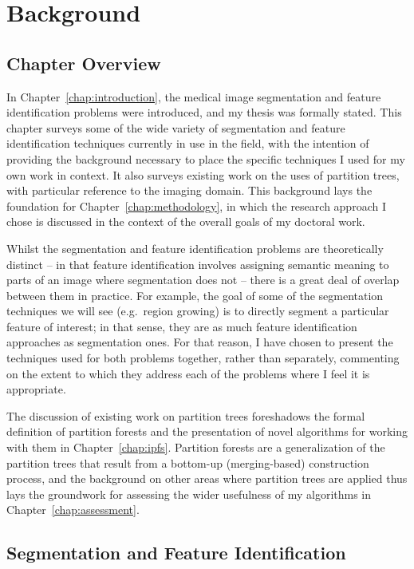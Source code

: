 \chapter{Background}
\label{chap:background}

\section{Chapter Overview}

In Chapter~\ref{chap:introduction}, the medical image segmentation and feature identification problems were introduced, and my thesis was formally stated. This chapter surveys some of the wide variety of segmentation and feature identification techniques currently in use in the field, with the intention of providing the background necessary to place the specific techniques I used for my own work in context. It also surveys existing work on the uses of partition trees, with particular reference to the imaging domain. This background lays the foundation for Chapter~\ref{chap:methodology}, in which the research approach I chose is discussed in the context of the overall goals of my doctoral work.

Whilst the segmentation and feature identification problems are theoretically distinct -- in that feature identification involves assigning semantic meaning to parts of an image where segmentation does not -- there is a great deal of overlap between them in practice. For example, the goal of some of the segmentation techniques we will see (e.g.~region growing) is to directly segment a particular feature of interest; in that sense, they are as much feature identification approaches as segmentation ones. For that reason, I have chosen to present the techniques used for both problems together, rather than separately, commenting on the extent to which they address each of the problems where I feel it is appropriate.

The discussion of existing work on partition trees foreshadows the formal definition of partition forests and the presentation of novel algorithms for working with them in Chapter~\ref{chap:ipfs}. Partition forests are a generalization of the partition trees that result from a bottom-up (merging-based) construction process, and the background on other areas where partition trees are applied thus lays the groundwork for assessing the wider usefulness of my algorithms in Chapter~\ref{chap:assessment}.

\section{Segmentation and Feature Identification}

